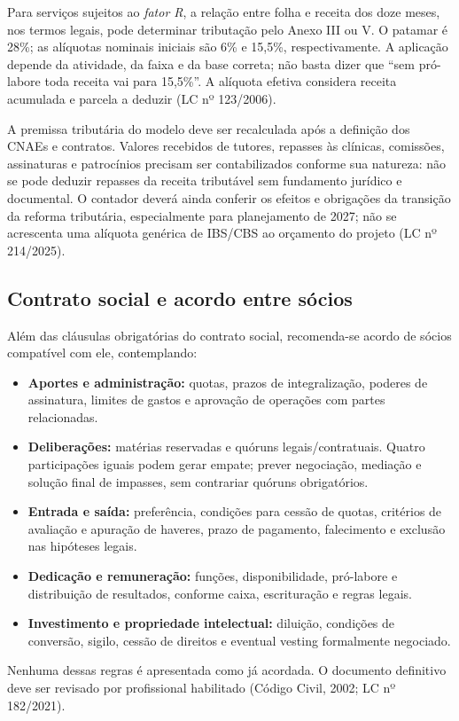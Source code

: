 Para serviços sujeitos ao \emph{fator R}, a relação entre folha e receita dos doze meses, nos termos legais, pode determinar tributação pelo Anexo III ou V. O patamar é 28\%; as alíquotas nominais iniciais são 6\% e 15,5\%, respectivamente. A aplicação depende da atividade, da faixa e da base correta; não basta dizer que ``sem pró-labore toda receita vai para 15,5\%''. A alíquota efetiva considera receita acumulada e parcela a deduzir (LC nº 123/2006).

A premissa tributária do modelo deve ser recalculada após a definição dos CNAEs e contratos. Valores recebidos de tutores, repasses às clínicas, comissões, assinaturas e patrocínios precisam ser contabilizados conforme sua natureza: não se pode deduzir repasses da receita tributável sem fundamento jurídico e documental. O contador deverá ainda conferir os efeitos e obrigações da transição da reforma tributária, especialmente para planejamento de 2027; não se acrescenta uma alíquota genérica de IBS/CBS ao orçamento do projeto (LC nº 214/2025).

\subsection{Contrato social e acordo entre sócios}
Além das cláusulas obrigatórias do contrato social, recomenda-se acordo de sócios compatível com ele, contemplando:
\begin{itemize}
\item \textbf{Aportes e administração:} quotas, prazos de integralização, poderes de assinatura, limites de gastos e aprovação de operações com partes relacionadas.
\item \textbf{Deliberações:} matérias reservadas e quóruns legais/contratuais. Quatro participações iguais podem gerar empate; prever negociação, mediação e solução final de impasses, sem contrariar quóruns obrigatórios.
\item \textbf{Entrada e saída:} preferência, condições para cessão de quotas, critérios de avaliação e apuração de haveres, prazo de pagamento, falecimento e exclusão nas hipóteses legais.
\item \textbf{Dedicação e remuneração:} funções, disponibilidade, pró-labore e distribuição de resultados, conforme caixa, escrituração e regras legais.
\item \textbf{Investimento e propriedade intelectual:} diluição, condições de conversão, sigilo, cessão de direitos e eventual vesting formalmente negociado.
\end{itemize}
Nenhuma dessas regras é apresentada como já acordada. O documento definitivo deve ser revisado por profissional habilitado (Código Civil, 2002; LC nº 182/2021).

